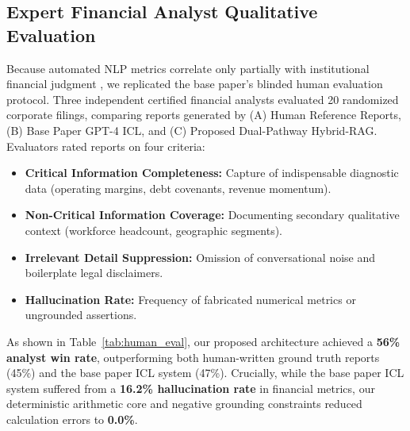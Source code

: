 \documentclass[conference]{IEEEtran}
\begin{document}
\subsection{Expert Financial Analyst Qualitative Evaluation}
Because automated NLP metrics correlate only partially with institutional financial judgment \cite{islam2023financebench}, we replicated the base paper's blinded human evaluation protocol. Three independent certified financial analysts evaluated 20 randomized corporate filings, comparing reports generated by (A) Human Reference Reports, (B) Base Paper GPT-4 ICL, and (C) Proposed Dual-Pathway Hybrid-RAG. Evaluators rated reports on four criteria:
\begin{itemize}
    \item \textbf{Critical Information Completeness:} Capture of indispensable diagnostic data (operating margins, debt covenants, revenue momentum).
    \item \textbf{Non-Critical Information Coverage:} Documenting secondary qualitative context (workforce headcount, geographic segments).
    \item \textbf{Irrelevant Detail Suppression:} Omission of conversational noise and boilerplate legal disclaimers.
    \item \textbf{Hallucination Rate:} Frequency of fabricated numerical metrics or ungrounded assertions.
\end{itemize}

As shown in Table~\ref{tab:human_eval}, our proposed architecture achieved a \textbf{56\% analyst win rate}, outperforming both human-written ground truth reports (45\%) and the base paper ICL system (47\%). Crucially, while the base paper ICL system suffered from a \textbf{16.2\% hallucination rate} in financial metrics, our deterministic arithmetic core and negative grounding constraints reduced calculation errors to \textbf{0.0\%}.

\begin{table}[h]
\caption{Human Financial Analyst Preference and Error Audit (20 Corporate Filings)}
\label{tab:human_eval}
\centering
{}
\end{table}
\end{document}
